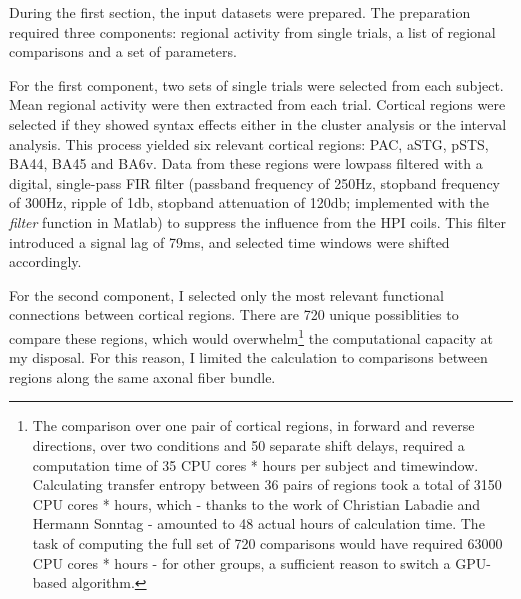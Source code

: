 During the first section, the input datasets were prepared.
The preparation required three components: regional activity from single trials, a list of regional comparisons and a set of parameters.

For the first component, two sets of single trials were selected from each subject.
Mean regional activity were then extracted from each trial.
Cortical regions were selected if they showed syntax effects either in the cluster analysis or the interval analysis.
This process yielded six relevant cortical regions: PAC, aSTG, pSTS, BA44, BA45 and BA6v.
Data from these regions were lowpass filtered with a digital, single-pass FIR filter (passband frequency of 250Hz, stopband frequency of 300Hz, ripple of 1db, stopband attenuation of 120db; implemented with the \emph{filter} function in Matlab) to suppress the influence from the HPI coils.
This filter introduced a signal lag of 79ms, and selected time windows were shifted accordingly.

For the second component, I selected only the most relevant functional connections between cortical regions.
There are 720 unique possiblities to compare these regions, which would overwhelm\footnote{The comparison over one pair of cortical regions, in forward and reverse directions, over two conditions and 50 separate shift delays, required a computation time of 35 CPU cores * hours per subject and timewindow. Calculating transfer entropy between 36 pairs of regions took a total of 3150 CPU cores * hours, which - thanks to the work of Christian Labadie and Hermann Sonntag - amounted to 48 actual hours of calculation time. The task of computing the full set of 720 comparisons would have required 63000 CPU cores * hours - for other groups, a sufficient reason to switch a GPU-based algorithm\cite{3.4.gpuTE}.} the computational capacity at my disposal. For this reason, I limited the calculation to comparisons between regions along the same axonal fiber bundle.

